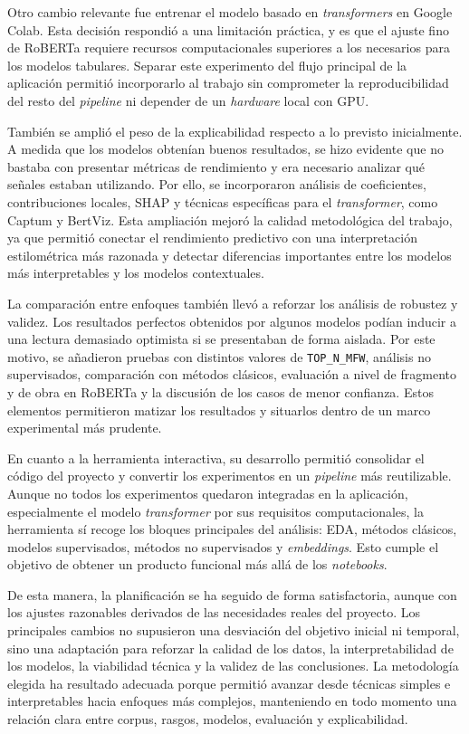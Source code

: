 \documentclass[IB]{TFUOC}%
\begin{document}
Otro cambio relevante fue entrenar el modelo basado en \textit{transformers} en Google Colab. Esta decisión respondió a una limitación práctica, y es que el ajuste fino de RoBERTa requiere recursos computacionales superiores a los necesarios para los modelos tabulares. Separar este experimento del flujo principal de la aplicación permitió incorporarlo al trabajo sin comprometer la reproducibilidad del resto del \textit{pipeline} ni depender de un \textit{hardware} local con GPU.

También se amplió el peso de la explicabilidad respecto a lo previsto inicialmente. A medida que los modelos obtenían buenos resultados, se hizo evidente que no bastaba con presentar métricas de rendimiento y era necesario analizar qué señales estaban utilizando. Por ello, se incorporaron análisis de coeficientes, contribuciones locales, SHAP y técnicas específicas para el \textit{transformer}, como Captum y BertViz. Esta ampliación mejoró la calidad metodológica del trabajo, ya que permitió conectar el rendimiento predictivo con una interpretación estilométrica más razonada y detectar diferencias importantes entre los modelos más interpretables y los modelos contextuales.

La comparación entre enfoques también llevó a reforzar los análisis de robustez y validez. Los resultados perfectos obtenidos por algunos modelos podían inducir a una lectura demasiado optimista si se presentaban de forma aislada. Por este motivo, se añadieron pruebas con distintos valores de \texttt{TOP\_N\_MFW}, análisis no supervisados, comparación con métodos clásicos, evaluación a nivel de fragmento y de obra en RoBERTa y la discusión de los casos de menor confianza. Estos elementos permitieron matizar los resultados y situarlos dentro de un marco experimental más prudente.

En cuanto a la herramienta interactiva, su desarrollo permitió consolidar el código del proyecto y convertir los experimentos en un \textit{pipeline} más reutilizable. Aunque no todos los experimentos quedaron integradas en la aplicación, especialmente el modelo \textit{transformer} por sus requisitos computacionales, la herramienta sí recoge los bloques principales del análisis: EDA, métodos clásicos, modelos supervisados, métodos no supervisados y \textit{embeddings}. Esto cumple el objetivo de obtener un producto funcional más allá de los \textit{notebooks}.

De esta manera, la planificación se ha seguido de forma satisfactoria, aunque con los ajustes razonables derivados de las necesidades reales del proyecto. Los principales cambios no supusieron una desviación del objetivo inicial ni temporal, sino una adaptación para reforzar la calidad de los datos, la interpretabilidad de los modelos, la viabilidad técnica y la validez de las conclusiones. La metodología elegida ha resultado adecuada porque permitió avanzar desde técnicas simples e interpretables hacia enfoques más complejos, manteniendo en todo momento una relación clara entre corpus, rasgos, modelos, evaluación y explicabilidad.
\end{document}
